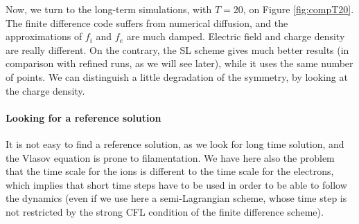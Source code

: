 \documentclass{article}
\numberwithin{equation}{section}
\begin{document}
Now, we turn to the long-term simulations, with $T=20$, on Figure \ref{fig:compT20}.  %
%
The finite difference code suffers from numerical diffusion, and the approximations of $f_i$ and $f_e$ are much damped. Electric field and charge density are really different.
On the contrary, the SL scheme gives much better results (in comparison with refined runs, as we will see later), while it uses the same number of points. We can distinguish a little degradation of the symmetry, by looking at the charge density.
%


\paragraph{Looking for a reference solution} %

It is not easy to find a reference solution, as we look for long time solution, and the Vlasov equation is prone to filamentation. We have here also the problem that the time scale for the ions is different to the time scale for the electrons, which implies that short time steps have to be used in order to be able to follow the dynamics (even if we use here a semi-Lagrangian scheme, whose time step is not restricted by the strong CFL condition
of the finite difference scheme).
\end{document}
